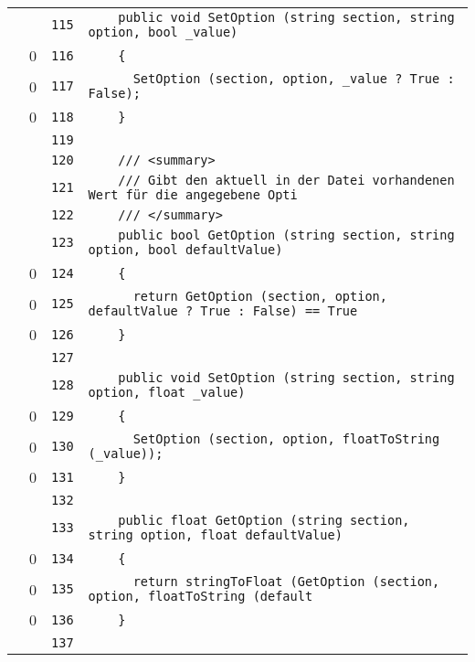 \documentclass[a4paper,10pt]{article}
\begin{document}
\begin{longtable}[l]{lrrl}
\cellcolor{gray} &  & \verb~115~ & \verb~    public void SetOption (string section, string option, bool _value)~\\
\cellcolor{red} & 0 & \verb~116~ & \verb~    {~\\
\cellcolor{red} & 0 & \verb~117~ & \verb~      SetOption (section, option, _value ? True : False);~\\
\cellcolor{red} & 0 & \verb~118~ & \verb~    }~\\
\cellcolor{gray} &  & \verb~119~ & \verb~~\\
\cellcolor{gray} &  & \verb~120~ & \verb~    /// <summary>~\\
\cellcolor{gray} &  & \verb~121~ & \verb~    /// Gibt den aktuell in der Datei vorhandenen Wert für die angegebene Opti~\\
\cellcolor{gray} &  & \verb~122~ & \verb~    /// </summary>~\\
\cellcolor{gray} &  & \verb~123~ & \verb~    public bool GetOption (string section, string option, bool defaultValue)~\\
\cellcolor{red} & 0 & \verb~124~ & \verb~    {~\\
\cellcolor{red} & 0 & \verb~125~ & \verb~      return GetOption (section, option, defaultValue ? True : False) == True ~\\
\cellcolor{red} & 0 & \verb~126~ & \verb~    }~\\
\cellcolor{gray} &  & \verb~127~ & \verb~~\\
\cellcolor{gray} &  & \verb~128~ & \verb~    public void SetOption (string section, string option, float _value)~\\
\cellcolor{red} & 0 & \verb~129~ & \verb~    {~\\
\cellcolor{red} & 0 & \verb~130~ & \verb~      SetOption (section, option, floatToString (_value));~\\
\cellcolor{red} & 0 & \verb~131~ & \verb~    }~\\
\cellcolor{gray} &  & \verb~132~ & \verb~~\\
\cellcolor{gray} &  & \verb~133~ & \verb~    public float GetOption (string section, string option, float defaultValue)~\\
\cellcolor{red} & 0 & \verb~134~ & \verb~    {~\\
\cellcolor{red} & 0 & \verb~135~ & \verb~      return stringToFloat (GetOption (section, option, floatToString (default~\\
\cellcolor{red} & 0 & \verb~136~ & \verb~    }~\\
\cellcolor{gray} &  & \verb~137~ & \verb~~\\

\end{longtable}
\end{document}
